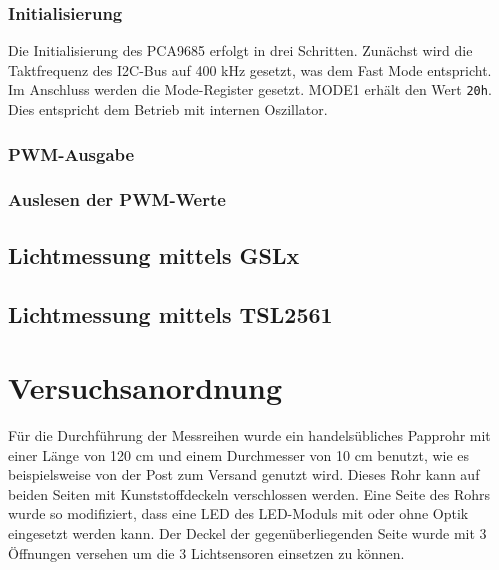 \documentclass[a4paper,12pt]{scrartcl}
\begin{document}
\subsubsection{Initialisierung}
Die Initialisierung des PCA9685 erfolgt in drei Schritten. Zunächst wird die Taktfrequenz des I2C-Bus auf 400 kHz gesetzt, was dem Fast Mode entspricht. Im
Anschluss werden die Mode-Register gesetzt. MODE1 erhält den Wert \texttt{20h}.
Dies entspricht dem Betrieb mit internen Oszillator.

\subsubsection{PWM-Ausgabe}
\subsubsection{Auslesen der PWM-Werte}
\subsection{Lichtmessung mittels GSLx}
\subsection{Lichtmessung mittels TSL2561}

\clearpage
\section{Versuchsanordnung}
Für die Durchführung der Messreihen wurde ein handelsübliches Papprohr mit
einer Länge von 120 cm und einem Durchmesser von 10 cm benutzt, wie es beispielsweise von der Post zum Versand genutzt wird. Dieses Rohr
kann auf beiden Seiten mit Kunststoffdeckeln verschlossen werden. Eine Seite
des Rohrs wurde so modifiziert, dass eine LED des LED-Moduls mit oder ohne
Optik eingesetzt werden kann. Der Deckel der gegenüberliegenden Seite wurde mit
3 Öffnungen versehen um die 3 Lichtsensoren einsetzen zu können.
\end{document}
